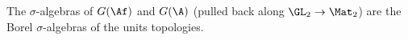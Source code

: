 The $\sigma$-algebras of $G(\Af)$ and $G(\A)$ (pulled back along $\GL_2\to\Mat_2$) are the Borel $\sigma$-algebras of the units topologies.
